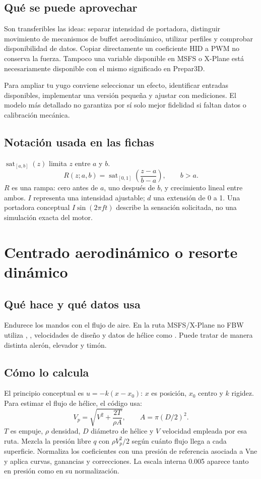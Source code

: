 \documentclass[11pt,a4paper]{article}
\newcommand{\code}[1]{\texttt{\detokenize{#1}}}
\newcommand{\efecto}[1]{\clearpage\section{#1}}
\newcommand{\sat}{\operatorname{sat}}
\begin{document}
\subsection{Qué se puede aprovechar}
Son transferibles las ideas: separar intensidad de portadora, distinguir movimiento de mecanismos de buffet aerodinámico, utilizar perfiles y comprobar disponibilidad de datos. Copiar directamente un coeficiente HID a PWM no conserva la fuerza. Tampoco una variable disponible en MSFS o X-Plane está necesariamente disponible con el mismo significado en Prepar3D.

Para ampliar tu yugo conviene seleccionar un efecto, identificar entradas disponibles, implementar una versión pequeña y ajustar con mediciones. El modelo más detallado no garantiza por sí solo mejor fidelidad si faltan datos o calibración mecánica.

\subsection{Notación usada en las fichas}
$\sat_{[a,b]}(z)$ limita $z$ entre $a$ y $b$.
\[
R(z;a,b)=\sat_{[0,1]}\left(\frac{z-a}{b-a}\right),\qquad b>a.
\]
$R$ es una rampa: cero antes de $a$, uno después de $b$, y crecimiento lineal entre ambos. $I$ representa una intensidad ajustable; $d$ una extensión de 0 a 1. Una portadora conceptual $I\sin(2\pi ft)$ describe la sensación solicitada, no una simulación exacta del motor.

\efecto{Centrado aerodinámico o resorte dinámico}
\subsection{Qué hace y qué datos usa}
Endurece los mandos con el flujo de aire. En la ruta MSFS/X-Plane no FBW utiliza \code{DynPressure}, \code{AirDensity}, velocidades de diseño y datos de hélice como \code{PropThrust}. Puede tratar de manera distinta alerón, elevador y timón.
\subsection{Cómo lo calcula}
El principio conceptual es $u=-k(x-x_0)$: $x$ es posición, $x_0$ centro y $k$ rigidez. Para estimar el flujo de hélice, el código usa:
\[
V_p=\sqrt{V^2+\frac{2T}{\rho A}},\qquad A=\pi(D/2)^2.
\]
$T$ es empuje, $\rho$ densidad, $D$ diámetro de hélice y $V$ velocidad empleada por esa ruta. Mezcla la presión libre $q$ con $\rho V_p^2/2$ según cuánto flujo llega a cada superficie. Normaliza los coeficientes con una presión de referencia asociada a Vne y aplica curvas, ganancias y correcciones. La escala interna 0.005 aparece tanto en presión como en su normalización.
\end{document}
